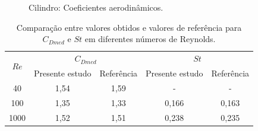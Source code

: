 \documentclass[tese_patricia]{subfiles}%
\begin{document}
\begin{figure}[!htb]
	\centering
	\\ 
	\\ 
	\caption{Cilindro: Coeficientes aerodinâmicos. }
	\label{fig:cilindro_coefAero}
\end{figure}


\begin{table}[h!]
	\centering
	\caption{Comparação entre valores obtidos e valores de referência para $C_{Dmed}$ e $St$ em diferentes números de Reynolds.}
	\begin{tabular}{|c|c|c|c|c|}
		\hline
		\multirow{2}{*}{$Re$} & \multicolumn{2}{c|}{$C_{Dmed}$} & \multicolumn{2}{c|}{$St$} \\ \cline{2-5}
		& Presente estudo & Referência & Presente estudo & Referência \\ \hline
		40   & 1,54  & 1,59 & - & - \\ \hline
		100  & 1,35 &  1,33 & 0,166 & 0,163 \\ \hline
		1000 & 1,52 &  1,51 & 0,238 & 0,235 \\ \hline
	\end{tabular}
	\label{tab:cilindro_CD_ST}
\end{table}
\end{document}
